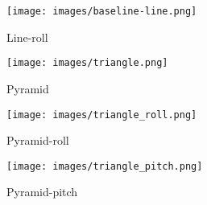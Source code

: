 \documentclass[10pt,twocolumn,letterpaper]{article}
\begin{document}
\begin{figure*}[t]
    \begin{subfigure}[b]{0.23\textwidth}
  \texttt{[image: images/baseline-line.png]}
                \caption{Line-roll}
    \end{subfigure}%
    \begin{subfigure}[b]{0.23\textwidth}
  \texttt{[image: images/triangle.png]}
                \caption{Pyramid}
    \end{subfigure}%
    \begin{subfigure}[b]{0.23\textwidth}
  \texttt{[image: images/triangle\_roll.png]}
                \caption{Pyramid-roll}
    \end{subfigure}%
    \begin{subfigure}[b]{0.23\textwidth}
  \texttt{[image: images/triangle\_pitch.png]}
                \caption{Pyramid-pitch}
    \end{subfigure}%

\end{figure*}
\end{document}
